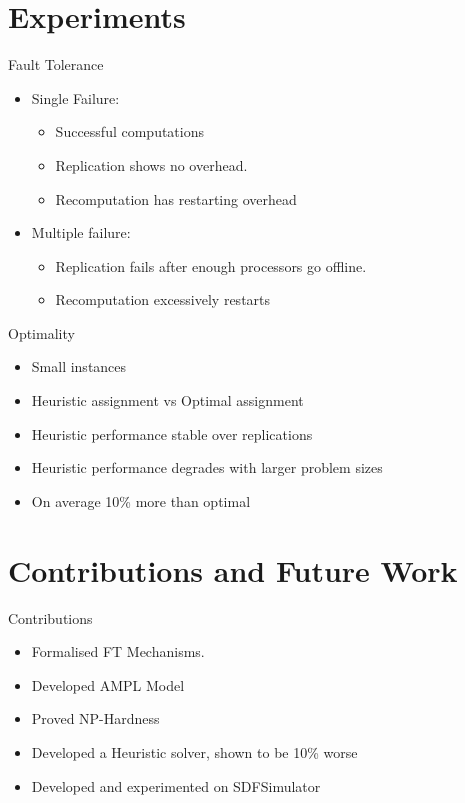 \documentclass{beamer}
\begin{document}
\section{Experiments}

\begin{frame}{Fault Tolerance}
\begin{itemize}
	\item Single Failure:
	\begin{itemize}
		\item Successful computations
		\item Replication shows no overhead.
		\item Recomputation has restarting overhead
	\end{itemize}
	\item Multiple failure:
	\begin{itemize}
		\item Replication fails after enough processors go offline.
		\item Recomputation excessively restarts
	\end{itemize}
\end{itemize}
\end{frame}

\begin{frame}{Optimality}
\begin{itemize}
	\item Small instances
	\item Heuristic assignment vs Optimal assignment
	\item Heuristic performance stable over replications
	\item Heuristic performance degrades with larger problem sizes
	\item On average 10\% more than optimal
\end{itemize}
\end{frame}

\section{Contributions and Future Work}

\begin{frame}{Contributions}
\begin{itemize}
	\item Formalised FT Mechanisms.
	\item Developed AMPL Model
	\item Proved NP-Hardness
	\item Developed a Heuristic solver, shown to be 10\% worse
	\item Developed and experimented on SDFSimulator
\end{itemize}
\end{frame}
\end{document}
